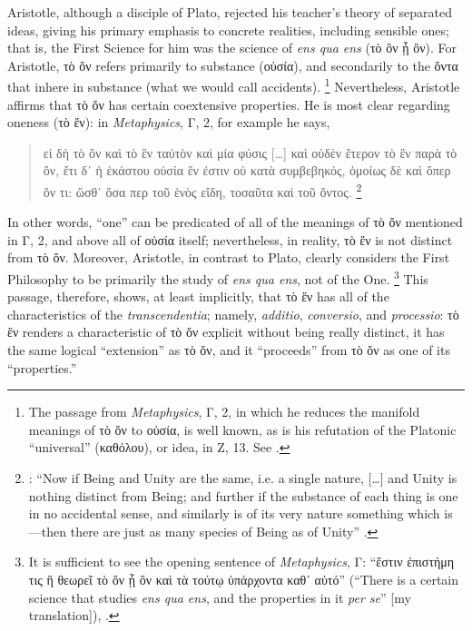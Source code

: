 Aristotle, although a disciple of Plato, rejected his teacher’s theory of separated ideas, giving his primary emphasis to concrete realities, including sensible ones; that is, the First Science for him was the science of \emph{ens qua ens} (τὸ ὂν ᾗ ὂν). For Aristotle, τὸ ὄν refers primarily to substance (οὐσία), and secondarily to the ὄντα that inhere in substance (what we would call accidents).%
%
\footnote{The passage from \emph{Metaphysics}, Γ, 2, in which he reduces the manifold meanings of τὸ ὄν to οὐσία, is well known, as is his refutation of the Platonic \enquote{universal} (καθόλου), or idea, in Ζ, 13. See \cite[Γ, 2, 1003a33-1003b4, and Ζ, 13, 1038b35-1039a3]{aristotle:metaphysics}.}
%
Nevertheless, Aristotle affirms that τὸ ὄν has certain coextensive properties. He is most clear regarding oneness (τὸ ἕν): in \emph{Metaphysics}, Γ, 2, for example he says,
%
\begin{quotation}
εἰ δὴ τὸ ὂν καὶ τὸ ἓν ταὐτὸν καὶ μία φύσις [\ldots] καὶ οὐδὲν ἕτερον τὸ ἓν παρὰ τὸ ὄν, ἔτι δ᾽ ἡ ἑκάστου οὐσία ἕν ἐστιν οὐ κατὰ συμβεβηκός, ὁμοίως δὲ καὶ ὅπερ ὄν τι: ὥσθ᾽ ὅσα περ τοῦ ἑνὸς εἴδη, τοσαῦτα καὶ τοῦ ὄντος.%
%
\footnote{\Cite[1003b23, 33-34]{aristotle:metaphysics}: \enquote{Now if Being and Unity are the same, i.e. a single nature, [\ldots] and Unity is nothing distinct from Being; and further if the substance of each thing is one in no accidental sense, and similarly is of its very nature something which is—then there are just as many species of Being as of Unity} \parencite[translation from][]{aristotle:metaphysics:en}.}
%
\end{quotation}
%
In other words, \enquote{one} can be predicated of all of the meanings of τὸ ὄν mentioned in Γ, 2, and above all of οὐσία itself; nevertheless, in reality, τὸ ἕν is not distinct from τὸ ὄν. Moreover, Aristotle, in contrast to Plato, clearly considers the First Philosophy to be primarily the study of \emph{ens qua ens}, not of the One.%
%
\footnote{It is sufficient to see the opening sentence of \emph{Metaphysics}, Γ: \enquote{ἔστιν ἐπιστήμη τις ἣ θεωρεῖ τὸ ὂν ᾗ ὂν καὶ τὰ τούτῳ ὑπάρχοντα καθ᾽ αὑτό} (\enquote{There is a certain science that studies \emph{ens qua ens}, and the properties in it \emph{per se}} [my translation]), \cite[Γ, 1, 1003a21]{aristotle:metaphysics}.}
%
This passage, therefore, shows, at least implicitly, that τὸ ἕν has all of the characteristics of the \emph{transcendentia}; namely, \emph{additio}, \emph{conversio}, and \emph{processio}: τὸ ἕν renders a characteristic of τὸ ὄν explicit without being really distinct, it has the same logical \enquote{extension} as τὸ ὄν, and it \enquote{proceeds} from τὸ ὄν as one of its \enquote{properties.}

